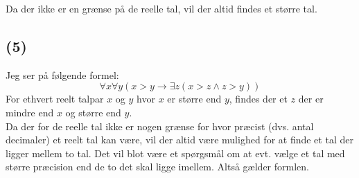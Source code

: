 \noindent
Da der ikke er en grænse på de reelle tal, vil der altid findes et større tal.

\subsection*{(5)}
Jeg ser på følgende formel:
\begin{equation}
  \forall x \forall y \left( x > y \rightarrow \exists z \left( x > z \land z > y \right) \right)
\end{equation}
For ethvert reelt talpar $x$ og $y$ hvor $x$ er større end $y$, findes der et $z$ der er mindre end $x$ og større end $y$.\\

\noindent
Da der for de reelle tal ikke er nogen grænse for hvor præcist (dvs. antal decimaler) et reelt tal kan være, vil der altid være mulighed for at finde et tal der ligger mellem to tal. Det vil blot være et spørgsmål om at evt. vælge et tal med større præcision end de to det skal ligge imellem. Altså gælder formlen.